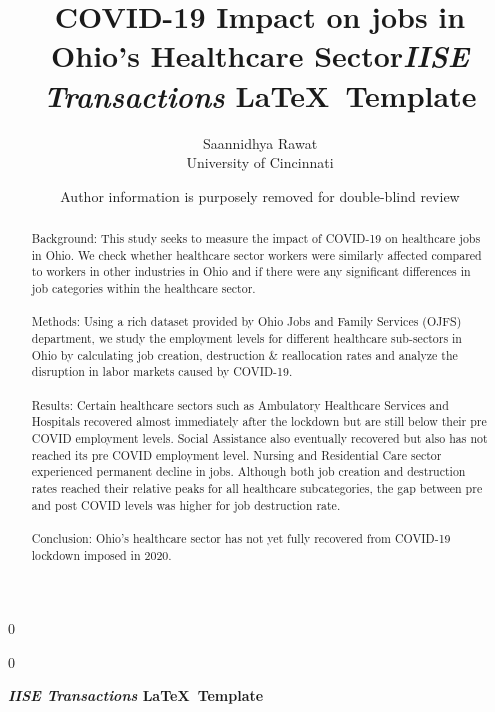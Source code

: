 \documentclass[11pt]{article}
\newcommand{\blind}{0}
\begin{document}
		
		\def\spacingset#1{\renewcommand{\baselinestretch}%
			{#1}\small\normalsize} \spacingset{1}
		
		\blind
		{
			\title{\bf COVID-19 Impact on jobs in \\ Ohio's Healthcare Sector}
			\author{Saannidhya Rawat \\
			University of Cincinnati\\
              }
			\date{}
			\maketitle
		} \fi
		
		\blind
		{

            \title{\bf \emph{IISE Transactions} \LaTeX \ Template}
			\author{Author information is purposely removed for double-blind review}
			
\bigskip
			\bigskip
			\bigskip
			\begin{center}
				{\LARGE\bf \emph{IISE Transactions} \LaTeX \ Template}
			\end{center}
			\medskip
		} \fi
		\bigskip
		
	\begin{abstract}
	\noindent%
Background: This study seeks to measure the impact of COVID-19 on healthcare jobs in Ohio. We check whether healthcare sector workers were similarly affected compared to workers in other industries in Ohio and if there were any significant differences in job categories within the healthcare sector.
\\
\\
Methods: Using a rich dataset provided by Ohio Jobs and Family Services (OJFS) department, we study the employment levels for different healthcare sub-sectors in Ohio by calculating job creation, destruction \& reallocation rates and analyze the disruption in labor markets caused by COVID-19.
\\
\\
Results: Certain healthcare sectors such as Ambulatory Healthcare Services and Hospitals recovered almost immediately after the lockdown but are still below their pre COVID employment levels. Social Assistance also eventually recovered but also has not reached its pre COVID employment level. Nursing and Residential Care sector experienced permanent decline in jobs. Although both job creation and destruction rates reached their relative peaks for all healthcare subcategories, the gap between pre and post COVID levels was higher for job destruction rate.
\\
\\
Conclusion: Ohio’s healthcare sector has not yet fully recovered from COVID-19 lockdown imposed in 2020.
 \\


	\end{abstract}
			
\end{document}
